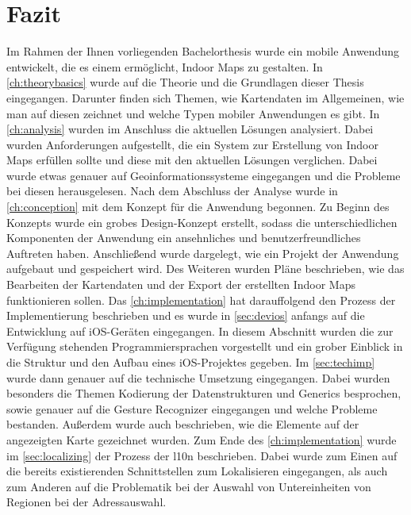 \chapter{Fazit}
\label{ch:conclusion}
Im Rahmen der Ihnen vorliegenden Bachelorthesis wurde ein mobile Anwendung entwickelt, die es einem ermöglicht, Indoor Maps zu gestalten.
In \autoref{ch:theorybasics} wurde auf die Theorie und die Grundlagen dieser Thesis eingegangen.
Darunter finden sich Themen, wie Kartendaten im Allgemeinen, wie man auf diesen zeichnet und welche Typen mobiler Anwendungen es gibt.\pbreak%
%
In \autoref{ch:analysis} wurden im Anschluss die aktuellen Lösungen analysiert.
Dabei wurden Anforderungen aufgestellt, die ein System zur Erstellung von Indoor Maps erfüllen sollte und diese mit den aktuellen Lösungen verglichen.
Dabei wurde etwas genauer auf Geoinformationssysteme eingegangen und die Probleme bei diesen herausgelesen.\pbreak%
%
Nach dem Abschluss der Analyse wurde in \autoref{ch:conception} mit dem Konzept für die Anwendung begonnen.
Zu Beginn des Konzepts wurde ein grobes Design-Konzept erstellt, sodass die unterschiedlichen Komponenten der Anwendung ein ansehnliches und benutzerfreundliches Auftreten haben.
Anschließend wurde dargelegt, wie ein Projekt der Anwendung aufgebaut und gespeichert wird.
Des Weiteren wurden Pläne beschrieben, wie das Bearbeiten der Kartendaten und der Export der erstellten Indoor Maps funktionieren sollen.\pbreak%
%
Das \autoref{ch:implementation} hat darauffolgend den Prozess der Implementierung beschrieben und es wurde in \autoref{sec:devios} anfangs auf die Entwicklung auf iOS-Geräten eingegangen.
In diesem Abschnitt wurden die zur Verfügung stehenden Programmiersprachen vorgestellt und ein grober Einblick in die Struktur und den Aufbau eines iOS-Projektes gegeben.
Im \autoref{sec:techimp} wurde dann genauer auf die technische Umsetzung eingegangen.
Dabei wurden besonders die Themen Kodierung der Datenstrukturen und Generics besprochen, sowie genauer auf die Gesture Recognizer eingegangen und welche Probleme bestanden.
Außerdem wurde auch beschrieben, wie die Elemente auf der angezeigten Karte gezeichnet wurden.\pbreak%
%
Zum Ende des \autoref{ch:implementation} wurde im \autoref{sec:localizing} der Prozess der \Gls{l10n} beschrieben.
Dabei wurde zum Einen auf die bereits existierenden Schnittstellen zum Lokalisieren eingegangen, als auch zum Anderen auf die Problematik bei der Auswahl von Untereinheiten von Regionen bei der Adressauswahl.

